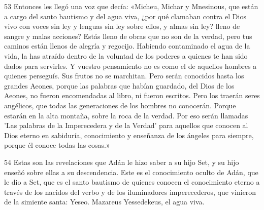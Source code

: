 \par 53 Entonces les llegó una voz que decía: «Micheu, Michar y Mnesinous, que están a cargo del santo bautismo y del agua viva, ¿por qué clamaban contra el Dios vivo con voces sin ley y lenguas sin ley sobre ellos, y almas sin ley? lleno de sangre y malas acciones? Estás lleno de obras que no son de la verdad, pero tus caminos están llenos de alegría y regocijo. Habiendo contaminado el agua de la vida, la has atraído dentro de la voluntad de los poderes a quienes te han sido dados para servirles. Y vuestro pensamiento no es como el de aquellos hombres a quienes perseguís. Sus frutos no se marchitan. Pero serán conocidos hasta los grandes Aeones, porque las palabras que habían guardado, del Dios de los Aeones, no fueron encomendadas al libro, ni fueron escritos. Pero los traerán seres angélicos, que todas las generaciones de los hombres no conocerán. Porque estarán en la alta montaña, sobre la roca de la verdad. Por eso serán llamadas 'Las palabras de la Imperecedera y de la Verdad' para aquellos que conocen al Dios eterno en sabiduría, conocimiento y enseñanza de los ángeles para siempre, porque él conoce todas las cosas.»

\par 54 Estas son las revelaciones que Adán le hizo saber a su hijo Set, y su hijo enseñó sobre ellas a su descendencia. Este es el conocimiento oculto de Adán, que le dio a Set, que es el santo bautismo de quienes conocen el conocimiento eterno a través de los nacidos del verbo y de los iluminadores imperecederos, que vinieron de la simiente santa: Yeseo. Mazareus Yessedekeus, el agua viva.



